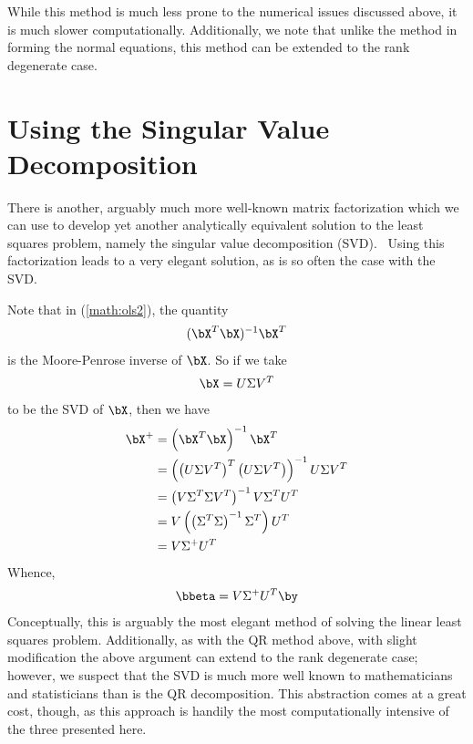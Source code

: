 While this method is much less prone to the numerical issues discussed above, it is much slower computationally.  Additionally, we note that unlike the method in forming the normal equations, this method can be extended to the rank degenerate case.




\section{Using the Singular Value Decomposition}
There is another, arguably much more well-known matrix factorization which we can use to develop yet another analytically equivalent solution to the least squares problem, namely the singular value decomposition
(SVD).~  Using this factorization leads to a very elegant solution, as is so often the case with the SVD.  

Note that in (\ref{math:ols2}), the quantity
\begin{align*}
(\bX^T\bX)^{-1}\bX^T
\end{align*}
is the Moore-Penrose inverse of $\bX$.  So if we take
\begin{align*}
\bX = U\Sigma V^T
\end{align*}
to be the SVD of $\bX$, then we have
\begin{align*}
\bX^+ &= \left(\bX^T\bX\right)^{-1}\bX^T\\
  &= \left( \left(U\Sigma V^T\right)^T \left(U\Sigma V^T\right) \right)^{-1} U\Sigma V^T\\
  &= \left( V\Sigma^T\Sigma V^T \right)^{-1} V\Sigma^T U^T\\
  &= V \left( \left(\Sigma^T\Sigma\right)^{-1} \Sigma^T \right) U^T\\
  &= V \Sigma^+ U^T
\end{align*}
Whence,
\begin{align*}
\bbeta = V\Sigma^+ U^T\by
\end{align*}
Conceptually, this is arguably the most elegant method of solving the linear least squares problem.  Additionally, as with the QR method above, with slight modification the above argument can extend to the rank degenerate case; however, we suspect that the SVD is much more well known to mathematicians and statisticians than is the QR decomposition.  This abstraction comes at a great cost, though, as this approach is handily the most computationally intensive of the three presented here.





